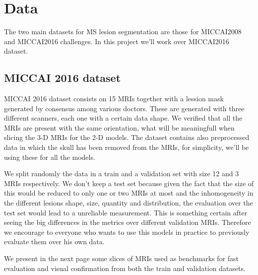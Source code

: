 \chapter{Data} 
\label{2.Data}




The two main datasets for MS lesion segmentation are those for MICCAI2008 and MICCAI2016 challenges. In this project we'll work over MICCAI2016 dataset.

\section{MICCAI 2016 dataset}

MICCAI 2016 dataset consists on 15 MRIs together with a lession mask generated by consensus among various doctors. These are generated with three different scanners, each one with a certain data shape. We verified that all the MRIs are present with the same orientation, what will be meaningfull when slicing the 3-D MRIs for the 2-D models. The dataset contains also preprocessed data in which the skull has been removed from the MRIs, for simplicity, we'll be using these for all the models.

We split randomly the data in a train and a validation set with size 12 and 3 MRIs respectively. We don't keep a test set because given the fact that the size of this would be reduced to only one or two MRIs at most and the inhomogeneity in the different lesions shape, size, quantity and distribution, the evaluation over the test set would lead to a unreliable measurement. This is something certain after seeing the big differences in the metrics over different validation MRIs. Therefore we encourage to everyone who wants to use this models in practice to previously evaluate them over his own data.

We present in the next page some slices of MRIs used as benchmarks for fast evaluation and visual confirmation from both the train and validation datasets.

